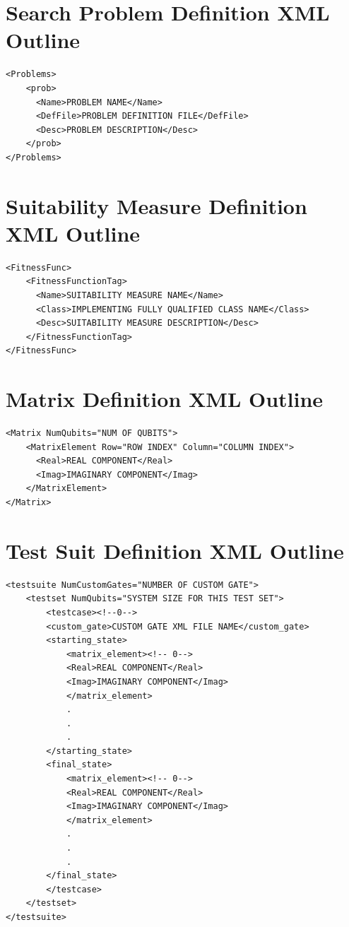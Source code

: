 \section{Search Problem Definition XML Outline}
\label{sec:probmanspecxml}
\lstset{language = XML}
\begin{lstlisting}
<Problems>
	<prob>
	  <Name>PROBLEM NAME</Name>
	  <DefFile>PROBLEM DEFINITION FILE</DefFile>
	  <Desc>PROBLEM DESCRIPTION</Desc>
	</prob>
</Problems>
\end{lstlisting}


\section{Suitability Measure Definition XML Outline}
\label{sec:probmanspecxml}
\lstset{language = XML}
\begin{lstlisting}
<FitnessFunc>
	<FitnessFunctionTag>
	  <Name>SUITABILITY MEASURE NAME</Name>
	  <Class>IMPLEMENTING FULLY QUALIFIED CLASS NAME</Class>
	  <Desc>SUITABILITY MEASURE DESCRIPTION</Desc>
	</FitnessFunctionTag>
</FitnessFunc>
\end{lstlisting}


\section{Matrix Definition XML Outline}
\label{sec:probmanspecxml}
\lstset{language = XML}
\begin{lstlisting}
<Matrix NumQubits="NUM OF QUBITS">
	<MatrixElement Row="ROW INDEX" Column="COLUMN INDEX">
	  <Real>REAL COMPONENT</Real>
	  <Imag>IMAGINARY COMPONENT</Imag>
	</MatrixElement>
</Matrix>
\end{lstlisting}


\section{Test Suit Definition XML Outline}
\label{sec:probmanspecxml}
\lstset{language = XML}
\begin{lstlisting}
<testsuite NumCustomGates="NUMBER OF CUSTOM GATE">
	<testset NumQubits="SYSTEM SIZE FOR THIS TEST SET">
	    <testcase><!--0-->
		<custom_gate>CUSTOM GATE XML FILE NAME</custom_gate>
		<starting_state>
		    <matrix_element><!-- 0-->
			<Real>REAL COMPONENT</Real>
			<Imag>IMAGINARY COMPONENT</Imag>
		    </matrix_element>
		    .
		    .
		    .
		</starting_state>
		<final_state>
		    <matrix_element><!-- 0-->
			<Real>REAL COMPONENT</Real>
			<Imag>IMAGINARY COMPONENT</Imag>
		    </matrix_element>
		    .
		    .
		    .
		</final_state>
	    </testcase>
	</testset>
</testsuite>
\end{lstlisting}

